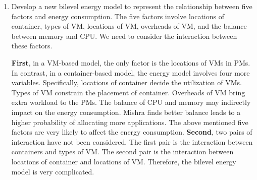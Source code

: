 \begin{enumerate}
	\item Develop a new bilevel energy model to represent the relationship between five factors and energy consumption. The five factors involve locations of container, types of VM, locations of VM, overheads of VM, and the balance between memory and CPU. We need to consider the interaction between these factors.

	\textbf{First}, in a VM-based model, the only factor is the locations of VMs in PMs. In contrast, in a container-based model,  the energy model involves four more variables. Specifically, locations of container decide the utilization of VMs. Types of VM constrain the placement of container. Overheads of VM bring extra workload to the PMs. The balance of CPU and memory may indirectly impact on the energy consumption. Mishra \cite{Mishra:2011bz} finds better balance leads to a higher probability of allocating more applications. The above mentioned five factors are very likely to affect the energy consumption. \textbf{Second},
	two pairs of interaction have not been considered. The first pair is the interaction between containers and types of VM. The second pair is the interaction between locations of container and locations of VM. Therefore, the bilevel energy model is very complicated.



\end{enumerate}
